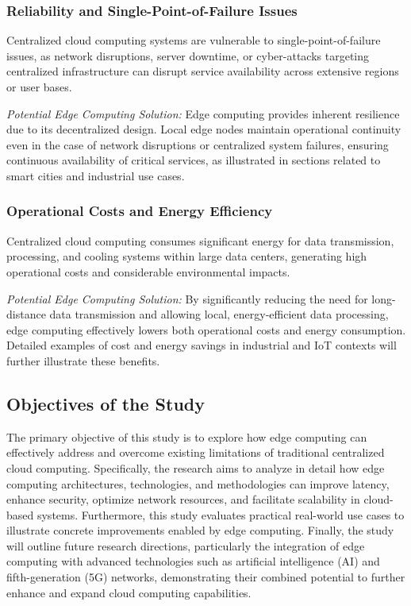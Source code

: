 \documentclass[runningheads]{llncs}
\begin{document}
\subsubsection{Reliability and Single-Point-of-Failure Issues}
Centralized cloud computing systems are vulnerable to single-point-of-failure issues, as network disruptions, server downtime, or cyber-attacks targeting centralized infrastructure can disrupt service availability across extensive regions or user bases.

\noindent\textit{Potential Edge Computing Solution:} Edge computing provides inherent resilience due to its decentralized design. Local edge nodes maintain operational continuity even in the case of network disruptions or centralized system failures, ensuring continuous availability of critical services, as illustrated in sections related to smart cities and industrial use cases.

\subsubsection{Operational Costs and Energy Efficiency}
Centralized cloud computing consumes significant energy for data transmission, processing, and cooling systems within large data centers, generating high operational costs and considerable environmental impacts.

\noindent\textit{Potential Edge Computing Solution:} By significantly reducing the need for long-distance data transmission and allowing local, energy-efficient data processing, edge computing effectively lowers both operational costs and energy consumption. Detailed examples of cost and energy savings in industrial and IoT contexts will further illustrate these benefits.

\subsection{Objectives of the Study}

The primary objective of this study is to explore how edge computing can effectively address and overcome existing limitations of traditional centralized cloud computing. Specifically, the research aims to analyze in detail how edge computing architectures, technologies, and methodologies can improve latency, enhance security, optimize network resources, and facilitate scalability in cloud-based systems. Furthermore, this study evaluates practical real-world use cases to illustrate concrete improvements enabled by edge computing. Finally, the study will outline future research directions, particularly the integration of edge computing with advanced technologies such as artificial intelligence (AI) and fifth-generation (5G) networks, demonstrating their combined potential to further enhance and expand cloud computing capabilities.
\end{document}

